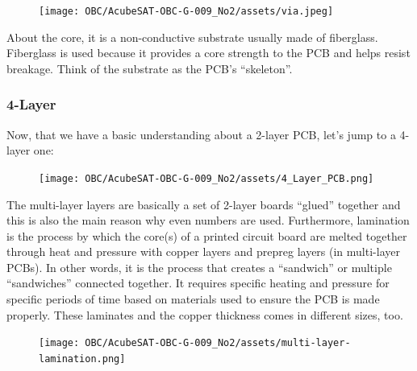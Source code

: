 \documentclass[final]{cubedoc}
\begin{document}
	\begin{figure}[h!]
		\centering
		\texttt{[image: OBC/AcubeSAT-OBC-G-009\_No2/assets/via.jpeg]}
		\caption{}
		\label{fig:my_label}
	\end{figure}
	
	About the core, it is a non-conductive substrate usually made of fiberglass. Fiberglass is used because it provides a core strength to the PCB and helps resist breakage. Think of the substrate as the PCB’s “skeleton”. 
	
	\subsubsection{4-Layer}
	Now, that we have a basic understanding about a 2-layer PCB, let’s jump to a 4-layer one:
	
	\begin{figure}[h!]
		\centering
		\texttt{[image: OBC/AcubeSAT-OBC-G-009\_No2/assets/4\_Layer\_PCB.png]}
		\caption{}
		\label{fig:my_label}
	\end{figure}
	
	The multi-layer layers are basically a set of 2-layer boards “glued” together and this is also the main reason why even numbers are used. Furthermore, lamination is the process by which the core(s) of a printed circuit board are melted together through heat and pressure with copper layers and prepreg layers (in multi-layer PCBs). In other words, it is the process that creates a “sandwich” or multiple “sandwiches” connected together. It requires specific heating and pressure for specific periods of time based on materials used to ensure the PCB is made properly.  These laminates and the copper thickness comes in different sizes, too.
	
	\begin{figure}[h!]
		\centering
		\texttt{[image: OBC/AcubeSAT-OBC-G-009\_No2/assets/multi-layer-lamination.png]}
		\caption{}
		\label{fig:my_label}
	\end{figure}
	
\end{document}
